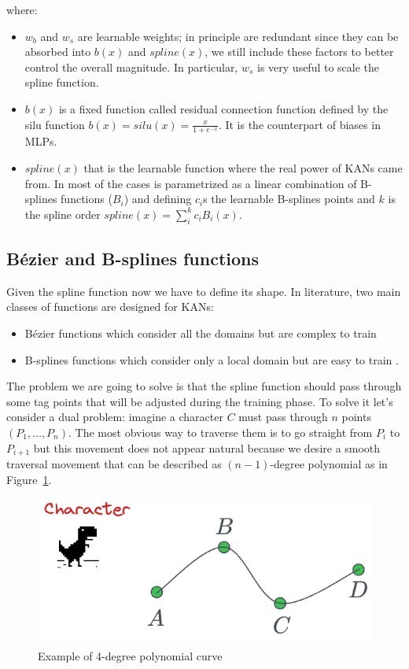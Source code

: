 \documentclass[12pt,a4paper]{article}
\begin{document}
where:
\begin{itemize}
    \item $w_b$ and $w_s$ are learnable weights; in principle are redundant since they can be absorbed into $b(x)$ and $spline(x)$, we still include these factors to better control the overall magnitude. In particular, $w_s$ is very useful to scale the spline function.
    \item $b(x)$ is a fixed function called residual connection function defined by the silu function $b(x) = silu(x) = \frac{x}{1+e^{-x}}$. It is the counterpart of biases in MLPs.
    \item $spline(x)$ that is the learnable function where the real power of KANs came from. In most of the cases is parametrized as a linear combination of B-splines functions ($B_i$) and defining $c_i$s the learnable B-splines points and $k$ is the spline order $spline(x)= \sum_i^k c_iB_i(x)$.
\end{itemize}

\subsection{Bézier and B-splines functions}
Given the spline function now we have to define its shape. In literature, two main classes of functions are designed for KANs:
\begin{itemize}
    \item Bézier functions which consider all the domains but are complex to train \cite{bezier}
    \item B-splines functions which consider only a local domain but are easy to train \cite{kan_intro}.
\end{itemize}

The problem we are going to solve is that the spline function should pass through some tag points that will be adjusted during the training phase. To solve it let's consider a dual problem: imagine a character $C$ must pass through $n$ points $(P_1, \dots,P_n)$. The most obvious way to traverse them is to go straight from $P_i$ to $P_{i+1}$ but this movement does not appear natural because we desire a smooth traversal movement that can be described as $(n-1)$-degree polynomial as in Figure~\ref{fig:bezier}.  
\begin{figure}[H]
    \centering
    \includegraphics[width=0.5\linewidth]{Images/bezier.png}
    \caption{Example of 4-degree polynomial curve}
    \label{fig:bezier}
\end{figure}
\end{document}
